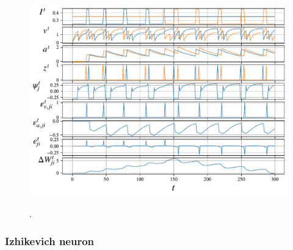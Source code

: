 	        \begin{figure}[ht]
	            \centering
	            \includegraphics[width=\linewidth]{gfx/stdpalif}
	            \label{fig:stdpalif}
	            \caption{.}
	        \end{figure}

		\subsubsection{Izhikevich neuron}

